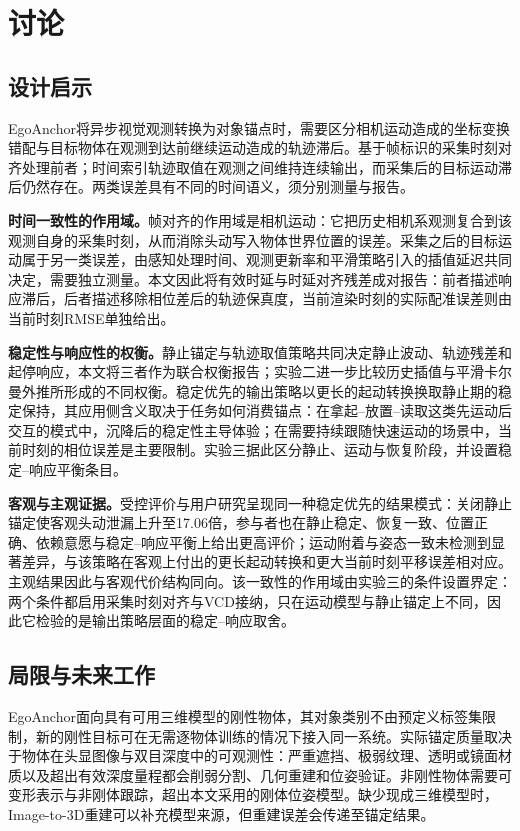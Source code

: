 \documentclass[review]{vgtc}
\begin{document}
\section{讨论}\label{sec:discussion}

\subsection{设计启示}

EgoAnchor将异步视觉观测转换为对象锚点时，需要区分相机运动造成的坐标变换错配与目标物体在观测到达前继续运动造成的轨迹滞后。基于帧标识的采集时刻对齐处理前者；时间索引轨迹取值在观测之间维持连续输出，而采集后的目标运动滞后仍然存在。两类误差具有不同的时间语义，须分别测量与报告。

\textbf{时间一致性的作用域。}帧对齐的作用域是相机运动：它把历史相机系观测复合到该观测自身的采集时刻，从而消除头动写入物体世界位置的误差。采集之后的目标运动属于另一类误差，由感知处理时间、观测更新率和平滑策略引入的插值延迟共同决定，需要独立测量。本文因此将有效时延与时延对齐残差成对报告：前者描述响应滞后，后者描述移除相位差后的轨迹保真度，当前渲染时刻的实际配准误差则由当前时刻RMSE单独给出。

\textbf{稳定性与响应性的权衡。}静止锚定与轨迹取值策略共同决定静止波动、轨迹残差和起停响应，本文将三者作为联合权衡报告；实验二进一步比较历史插值与平滑卡尔曼外推所形成的不同权衡。稳定优先的输出策略以更长的起动转换换取静止期的稳定保持，其应用侧含义取决于任务如何消费锚点：在拿起--放置--读取这类先运动后交互的模式中，沉降后的稳定性主导体验；在需要持续跟随快速运动的场景中，当前时刻的相位误差是主要限制。实验三据此区分静止、运动与恢复阶段，并设置稳定--响应平衡条目。

\textbf{客观与主观证据。}受控评价与用户研究呈现同一种稳定优先的结果模式：关闭静止锚定使客观头动泄漏上升至17.06倍，参与者也在静止稳定、恢复一致、位置正确、依赖意愿与稳定--响应平衡上给出更高评价；运动附着与姿态一致未检测到显著差异，与该策略在客观上付出的更长起动转换和更大当前时刻平移误差相对应。主观结果因此与客观代价结构同向。该一致性的作用域由实验三的条件设置界定：两个条件都启用采集时刻对齐与VCD接纳，只在运动模型与静止锚定上不同，因此它检验的是输出策略层面的稳定--响应取舍。

\subsection{局限与未来工作}

EgoAnchor面向具有可用三维模型的刚性物体，其对象类别不由预定义标签集限制，新的刚性目标可在无需逐物体训练的情况下接入同一系统。实际锚定质量取决于物体在头显图像与双目深度中的可观测性：严重遮挡、极弱纹理、透明或镜面材质以及超出有效深度量程都会削弱分割、几何重建和位姿验证。非刚性物体需要可变形表示与非刚体跟踪，超出本文采用的刚体位姿模型。缺少现成三维模型时，Image-to-3D重建可以补充模型来源，但重建误差会传递至锚定结果。
\end{document}
